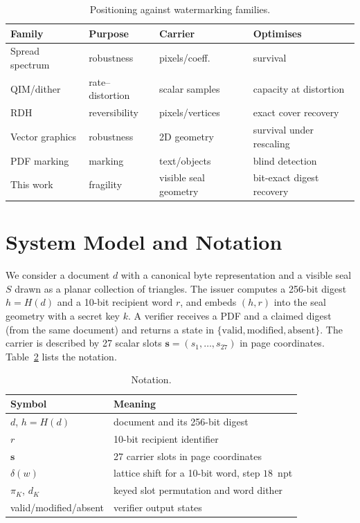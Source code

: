 \documentclass[journal]{IEEEtran}
\begin{document}
\begin{table}[t]
\centering
\footnotesize
\caption{Positioning against watermarking families.}
\label{tab:families}
\begin{tabular}{@{}p{1.55cm}p{1.25cm}p{1.35cm}p{1.55cm}@{}}
\toprule
Family & Purpose & Carrier & Optimises \\
\midrule
Spread spectrum \cite{cox1997} & robustness & pixels/coeff. & survival \\
QIM/dither \cite{chen2001,eggers2003,perez2004} & rate--distortion & scalar samples & capacity at distortion \\
RDH \cite{tian2003,ni2006,thodi2007,wang2014,peng2019} & reversibility & pixels/vertices & exact cover recovery \\
Vector graphics \cite{doncel2007,li2003,hou2014,mouhamed2012} & robustness & 2D geometry & survival under rescaling \\
PDF marking \cite{hatoum2018} & marking & text/objects & blind detection \\
This work & fragility & visible seal geometry & bit-exact digest recovery \\
\bottomrule
\end{tabular}
\end{table}

\section{System Model and Notation}\label{sec:model}
We consider a document $d$ with a canonical byte representation and a visible seal $S$ drawn as a planar collection of triangles. The issuer computes a 256-bit digest $h=H(d)$ and a 10-bit recipient word $r$, and embeds $(h,r)$ into the seal geometry with a secret key $k$. A verifier receives a PDF and a claimed digest (from the same document) and returns a state in $\{\text{valid},\text{modified},\text{absent}\}$. The carrier is described by 27 scalar slots $\mathbf{s}=(s_1,\dots,s_{27})$ in page coordinates. Table~\ref{tab:notation} lists the notation.

\begin{table}[t]
\centering
\footnotesize
\caption{Notation.}
\label{tab:notation}
\begin{tabular}{@{}ll@{}}
\toprule
Symbol & Meaning \\
\midrule
$d$, $h=H(d)$ & document and its 256-bit digest \\
$r$ & 10-bit recipient identifier \\
$\mathbf{s}$ & 27 carrier slots in page coordinates \\
$\delta(w)$ & lattice shift for a 10-bit word, step $18$~npt \\
$\pi_K$, $d_K$ & keyed slot permutation and word dither \\
valid/modified/absent & verifier output states \\
\bottomrule
\end{tabular}
\end{table}
\end{document}
